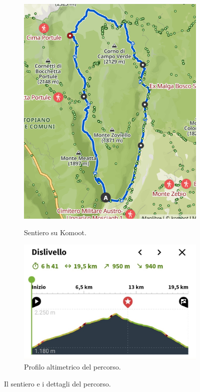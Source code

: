 \documentclass{article}
\begin{document}
\begin{figure}[htbp!]
\begin{subfigure}[t]{0.45\textwidth}
        \centering
        \vspace{0pt} %
        \includegraphics[width=\textwidth]{images/sentiero_komoot.png}
        \caption{Sentiero su Komoot.}
        \label{fig:foto_corta1}
        \vspace{1em} %
        \includegraphics[width=\textwidth]{images/profilo_altimetrico.jpg}
        \caption{Profilo altimetrico del percorso.}
        \label{fig:foto_corta2}
    \end{subfigure}
    \caption{Il sentiero e i dettagli del percorso.}
    \label{fig:panoramica_dettagli}
\end{figure}
\end{document}
